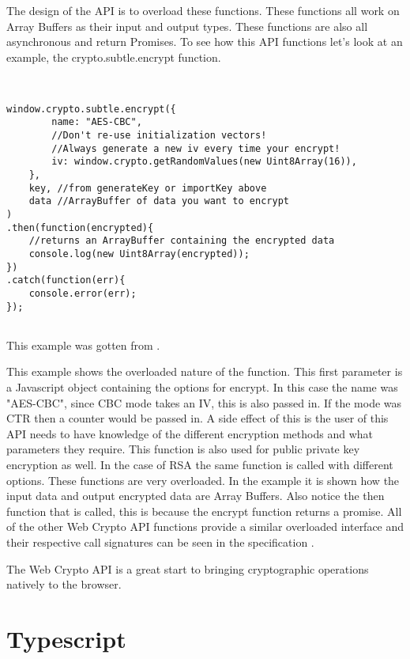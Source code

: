 The design of the API is to overload these functions. These functions all work on Array Buffers as their input and output types. These functions are also all asynchronous and return Promises. To see how this API functions let's look at an example, the crypto.subtle.encrypt function.


\begin{lstlisting}


window.crypto.subtle.encrypt({
        name: "AES-CBC",
        //Don't re-use initialization vectors!
        //Always generate a new iv every time your encrypt!
        iv: window.crypto.getRandomValues(new Uint8Array(16)),
    },
    key, //from generateKey or importKey above
    data //ArrayBuffer of data you want to encrypt
)
.then(function(encrypted){
    //returns an ArrayBuffer containing the encrypted data
    console.log(new Uint8Array(encrypted));
})
.catch(function(err){
    console.error(err);
});


\end{lstlisting}


This example was gotten from \cite{aes-example}.


This example shows the overloaded nature of the function. This first parameter is a Javascript object containing the options for encrypt. In this case the name was "AES-CBC", since CBC mode takes an IV, this is also passed in. If the mode was CTR then a counter would be passed in. A side effect of this is the user of this API needs to have knowledge of the different encryption methods and what parameters they require. This function is also used for public private key encryption as well. In the case of RSA the same function is called with different options. These functions are very overloaded. In the example it is shown how the input data and output encrypted data are Array Buffers. Also notice the then function that is called, this is because the encrypt function returns a promise. All of the other Web Crypto API functions provide a similar overloaded interface and their respective call signatures can be seen in the specification \cite{webcrypto-overview}.


The Web Crypto API is a great start to bringing cryptographic operations natively to the browser.


\section{Typescript}


